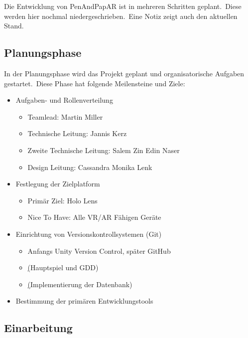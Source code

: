 Die Entwicklung von PenAndPapAR ist in mehreren Schritten geplant.\ Diese werden hier nochmal niedergeschrieben.\ Eine
Notiz zeigt auch den aktuellen Stand.

\subsection{Planungsphase}\label{subsec:planning}
In der Planungsphase wird das Projekt geplant und organisatorische Aufgaben gestartet.\ Diese Phase hat folgende
Meilensteine und Ziele:

\begin{itemize}
    \item Aufgaben- und Rollenverteilung
    \begin{itemize}
        \item Teamlead: Martin Miller
        \item Technische Leitung: Jannis Kerz
        \item Zweite Technische Leitung: Salem Zin Edin Naser
        \item Design Leitung: Cassandra Monika Lenk
    \end{itemize}
    \item Festlegung der Zielplatform
    \begin{itemize}
        \item Primär Ziel: Holo Lens
        \item Nice To Have: Alle VR/AR Fähigen Geräte
    \end{itemize}
    \item Einrichtung von Versionskontrollsystemen (Git)
    \begin{itemize}
        \item Anfangs Unity Version Control, später GitHub
        \item \href{https://github.com/Sc1p1o/PenAndPapARGDD}(Hauptspiel und GDD)
        \item \href{https://github.com/Sc1p1o/PenAndPapARDB}(Implementierung der Datenbank)
    \end{itemize}
    \item Bestimmung der primären Entwicklungstools
\end{itemize}

\subsection{Einarbeitung}\label{subsec:getting_started}


\label{subsec:mvp}


